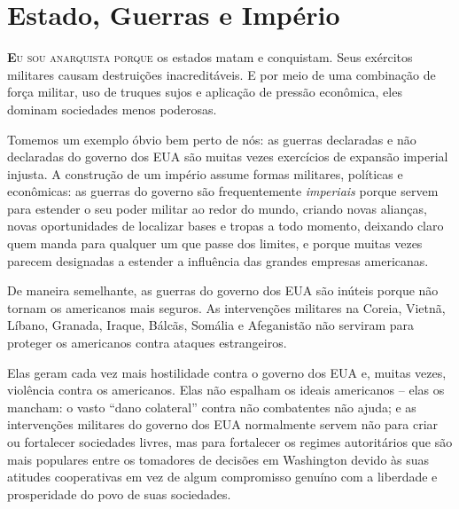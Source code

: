 
\chapter{Estado, Guerras e Império}
\label{chap:4}

\lettrine[lines=2]{\textcolor{LettrineColor}{\textbf{E}}}{u sou anarquista porque} os estados matam e conquistam. Seus exércitos militares causam destruições inacreditáveis. E por meio de uma combinação de força militar, uso de truques sujos e aplicação de pressão econômica, eles dominam sociedades menos poderosas.

Tomemos um exemplo óbvio bem perto de nós: as guerras declaradas e não declaradas do governo dos EUA são muitas vezes exercícios de expansão imperial injusta. A construção de um império assume formas militares, políticas e econômicas: as guerras do governo são frequentemente \emph{imperiais} porque servem para estender o seu poder militar ao redor do mundo, criando novas alianças, novas oportunidades de localizar bases e tropas a todo momento, deixando claro quem manda para qualquer um que passe dos limites, e porque muitas vezes parecem designadas a estender a influência das grandes empresas americanas.

De maneira semelhante, as guerras do governo dos EUA são inúteis porque não tornam os americanos mais seguros. As intervenções militares na Coreia, Vietnã, Líbano, Granada, Iraque, Bálcãs, Somália e Afeganistão não serviram para proteger os americanos contra ataques estrangeiros.

Elas geram cada vez mais hostilidade contra o governo dos EUA e, muitas vezes, violência contra os americanos. Elas não espalham os ideais americanos -- elas os mancham: o vasto ``dano colateral'' contra não combatentes não ajuda; e as intervenções militares do governo dos EUA normalmente servem não para criar ou fortalecer sociedades livres, mas para fortalecer os regimes autoritários que são mais populares entre os tomadores de decisões em Washington devido às suas atitudes cooperativas em vez de algum compromisso genuíno com a liberdade e prosperidade do povo de suas sociedades.

